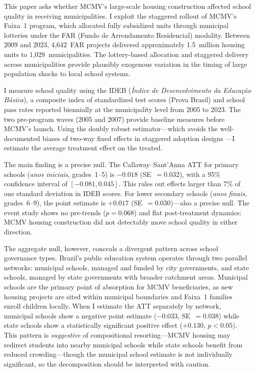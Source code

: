 \documentclass[12pt]{article}
\begin{document}
This paper asks whether MCMV's large-scale housing construction affected school quality in receiving municipalities. I exploit the staggered rollout of MCMV's Faixa~1 program, which allocated fully subsidized units through municipal lotteries under the FAR (Fundo de Arrendamento Residencial) modality. Between 2009 and 2023, 4,642~FAR projects delivered approximately 1.5~million housing units to 1,028~municipalities. The lottery-based allocation and staggered delivery across municipalities provide plausibly exogenous variation in the timing of large population shocks to local school systems.

I measure school quality using the IDEB (\textit{\'Indice de Desenvolvimento da Educa\c{c}\~ao B\'asica}), a composite index of standardized test scores (Prova Brasil) and school pass rates reported biennially at the municipality level from 2005 to 2023. The two pre-program waves (2005 and 2007) provide baseline measures before MCMV's launch. Using the \citet{callaway2021difference} doubly robust estimator---which avoids the well-documented biases of two-way fixed effects in staggered adoption designs \citep{goodman2021difference, sun2021estimating, dechaisemartin2020two}---I estimate the average treatment effect on the treated.

The main finding is a precise null. The Callaway--Sant'Anna ATT for primary schools (\textit{anos iniciais}, grades~1--5) is $-0.018$ (SE~$= 0.032$), with a 95\% confidence interval of $[-0.081, 0.045]$. This rules out effects larger than 7\% of one standard deviation in IDEB scores. For lower secondary schools (\textit{anos finais}, grades~6--9), the point estimate is $+0.017$ (SE~$= 0.030$)---also a precise null. The event study shows no pre-trends ($p = 0.068$) and flat post-treatment dynamics: MCMV housing construction did not detectably move school quality in either direction.

The aggregate null, however, conceals a divergent pattern across school governance types. Brazil's public education system operates through two parallel networks: municipal schools, managed and funded by city governments, and state schools, managed by state governments with broader catchment areas. Municipal schools are the primary point of absorption for MCMV beneficiaries, as new housing projects are sited within municipal boundaries and Faixa~1 families enroll children locally. When I estimate the ATT separately by network, municipal schools show a negative point estimate ($-0.033$, SE~$= 0.038$) while state schools show a statistically significant positive effect ($+0.130$, $p < 0.05$). This pattern is \textit{suggestive} of compositional resorting---MCMV housing may redirect students into nearby municipal schools while state schools benefit from reduced crowding---though the municipal school estimate is not individually significant, so the decomposition should be interpreted with caution.
\end{document}
